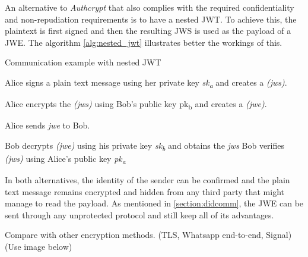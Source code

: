 An alternative to \emph{Authcrypt} that also complies with the required confidentiality and non-repudiation requirements is to have a nested JWT. To achieve this, the plaintext is first signed and then the resulting JWS is used as the payload of a JWE. The algorithm \ref{alg:nested_jwt} illustrates better the workings of this. 

\begin{algorithm}[H]
  \caption{Communication example with nested JWT}
  \label{alg:nested_jwt}
    \begin{algorithmic}[1]
      \State Alice signs a plain text message using her private key \emph{sk\textsubscript{a}} and creates a \emph{(jws)}.
  
      \State Alice encrypts the \emph{(jws)} using Bob's public key pk\textsubscript{b} and creates a \emph{(jwe)}.
  
      \State Alice sends \emph{jwe} to Bob.
  
      \State Bob decrypts \emph{(jwe)} using his private key \emph{sk\textsubscript{b}} and obtains the \emph{jws}
      \State Bob verifies \emph{(jws)} using Alice's public key \emph{pk\textsubscript{a}}
  \end{algorithmic}
\end{algorithm}
  
In both alternatives, the identity of the sender can be confirmed and the plain text message remains encrypted and hidden from any third party that might manage to read the payload. As mentioned in \autoref{section:didcomm}, the JWE can be sent through any unprotected protocol and still keep all of its advantages. 



Compare with other encryption methods. (TLS, Whatsapp end-to-end, Signal) (Use image below)
 

